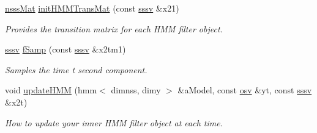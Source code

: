 \begin{DoxyCompactItemize}
\hyperlink{classmsl1__rbbpf_a8dd96568dc27eddb553e9ff8bf4b3c64}{nsss\+Mat} \hyperlink{classmsl1__rbbpf_a811836dd2d71e3c46e688b9280aae108}{init\+H\+M\+M\+Trans\+Mat} (const \hyperlink{classmsl1__rbbpf_a6703c548bb85bbe8e5a6baa723e8f0bb}{sssv} \&x21)
\begin{DoxyCompactList}\small\item\em Provides the transition matrix for each H\+MM filter object. \end{DoxyCompactList}\item 
\hyperlink{classmsl1__rbbpf_a6703c548bb85bbe8e5a6baa723e8f0bb}{sssv} \hyperlink{classmsl1__rbbpf_a45c6dc4e6b66b091245000e5a59605f5}{f\+Samp} (const \hyperlink{classmsl1__rbbpf_a6703c548bb85bbe8e5a6baa723e8f0bb}{sssv} \&x2tm1)
\begin{DoxyCompactList}\small\item\em Samples the time t second component. \end{DoxyCompactList}\item 
void \hyperlink{classmsl1__rbbpf_aa22847dfe35723fa3623385d1b534989}{update\+H\+MM} (hmm$<$ dimnss, dimy $>$ \&a\+Model, const \hyperlink{classmsl1__rbbpf_a23daf10ba0f0b6fead88bc83b4fa27a3}{osv} \&yt, const \hyperlink{classmsl1__rbbpf_a6703c548bb85bbe8e5a6baa723e8f0bb}{sssv} \&x2t)
\begin{DoxyCompactList}\small\item\em How to update your inner H\+MM filter object at each time. \end{DoxyCompactList}\end{DoxyCompactItemize}

